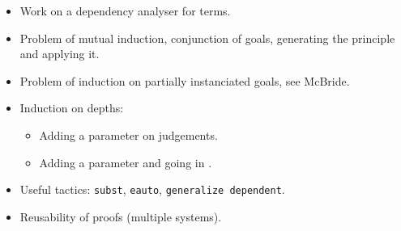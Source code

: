 \documentclass{article}
\def\tactic#1{\texttt{#1}}
\begin{document}
\begin{itemize}
\item Work on a dependency analyser for terms.
\item Problem of mutual induction, conjunction of goals, generating the
  principle and applying it.
\item Problem of induction on partially instanciated goals, see McBride.
\item Induction on depths:
  \begin{itemize}
  \item Adding a parameter on judgements.
  \item Adding a parameter and going in \Set.
  \end{itemize}
\item Useful tactics: \tactic{subst}, \tactic{eauto}, \tactic{generalize dependent}.
\item Reusability of proofs (multiple systems).
\end{itemize}







\end{document}
